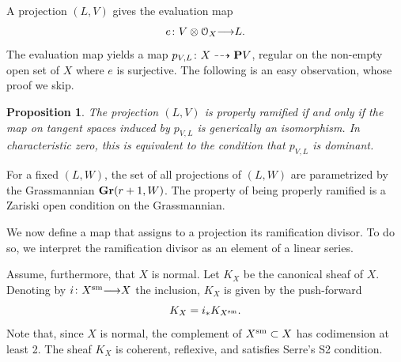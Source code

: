 \documentclass[11pt,reqno]{amsart}
\theoremstyle{plain}
\newtheorem{proposition}[theorem]{Proposition}
\theoremstyle{definition}
\theoremstyle{remark}
\numberwithin{equation}{section}
\renewcommand{\to}{{\longrightarrow}}
\numberwithin{equation}{section}
\renewcommand{\O}{\mathcal O}
\begin{document}
A projection $(L, V)$ gives the evaluation map
\[e \from V \otimes \O_X \to L.\]
The evaluation map yields a map $p_{V,L} {\colon} X \dashrightarrow {\bf P} V$, regular on the non-empty open set of $X$ where $e$ is surjective.
The following is an easy observation, whose proof we skip.
\begin{proposition}\label{prop:proj}
  The projection $(L, V)$ is properly ramified if and only if the map on tangent spaces induced by $p_{V,L}$ is generically an isomorphism.
  In characteristic zero, this is equivalent to the condition that $p_{V,L}$ is dominant.
\end{proposition}

For a fixed $(L, W)$, the set of all projections of $(L, W)$ are parametrized by the Grassmannian ${\bf Gr}(r+1, W)$.
The property of being properly ramified is a Zariski open condition on the Grassmannian.

We now define a map that assigns to a projection its ramification divisor.
To do so, we interpret the ramification divisor as an element of a linear series.

Assume, furthermore, that $X$ is normal.
Let $K_X$ be the canonical sheaf of $X$.
Denoting by $i \from X^{\rm sm} \to X$ the inclusion, $K_X$ is given by the push-forward
\[ K_X = i_* K_{X^{\rm sm}}.\]
Note that, since $X$ is normal, the complement of $X^{\rm sm} \subset X$ has codimension at least 2.
The sheaf $K_X$ is coherent, reflexive, and satisfies Serre's S2 condition.
\end{document}
